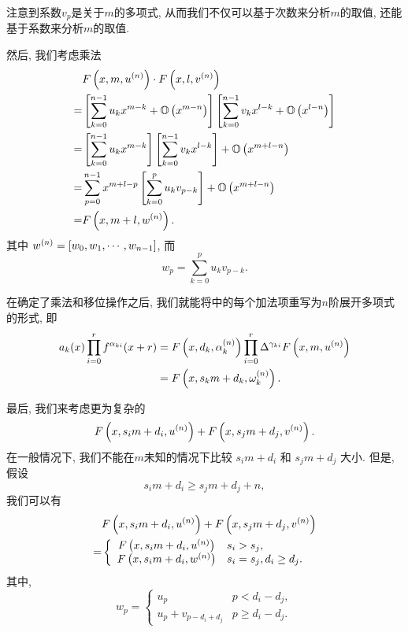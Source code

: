 注意到系数$v_p$是关于$m$的多项式, 从而我们不仅可以基于次数来分析$m$的取值, 还能基于系数来分析$m$的取值. 

然后, 我们考虑乘法 
\begin{equation}
\begin{split}
& F\left(x,m,u ^{(n)}\right)\cdot F\left(x,l,v^{(n)}\right) \\
=& \left[\sum_{k=0}^{n-1}{u_k x^{m-k}}+\mathbb O\left(x^{m-n}\right)\right]\left[\sum_{k=0}^{n-1}{v_k x^{l-k}}+\mathbb O\left(x^{l-n}\right)\right] \\
=& \left[\sum_{k=0}^{n-1}{u_k x^{m-k}}\right]\left[\sum_{k=0}^{n-1}{v_k x^{l-k}}\right]+\mathbb O\left(x^{m+l-n}\right) \\
=& \sum_{p=0}^{n-1}{x^{m+l-p}\left[\sum_{k=0}^p{u_k v_{p-k}}\right]}+\mathbb O\left(x^{m+l-n}\right) \\
=& F\left(x,m+l,w^{(n)}\right) .
\end{split}
\end{equation}
其中 $w^{(n)}=\left[w_0,w_1,\cdots,w_{n-1}\right]$, 而
\begin{equation}
w_p=\sum_{k=0}^p{u_k v_{p-k}}.
\end{equation}

在确定了乘法和移位操作之后, 我们就能将中的每个加法项重写为$n$阶展开多项式的形式, 即
\begin{equation}
\begin{split}
a_k(x)\prod_{i=0}^r{f^{\alpha_{ki}}(x+r)}&=F\left(x,d_k,\alpha_k^{(n)}\right)\prod_{i=0}^r{\Delta^{\gamma_{ki}}F\left(x,m,u^{(n)}\right)} \\
&= F\left(x,s_k m+d_k, \omega_k^{(n)}\right) .
\end{split}
\end{equation}

最后, 我们来考虑更为复杂的
\begin{equation}
F\left(x,s_i m+d_i,u^{(n)}\right)+F\left(x,s_j m+d_j,v^{(n)}\right).
\end{equation}
在一般情况下, 我们不能在$m$未知的情况下比较 $s_i m + d_i$ 和 $s_j m + d_j$ 大小. 但是, 假设
\begin{equation}
s_i m+d_i\ge s_j m+d_j+n, \label{cond_add}
\end{equation}
我们可以有 
\begin{equation}
\begin{split}
&F\left(x,s_i m+d_i,u^{(n)}\right)+F\left(x,s_j m+d_j,v^{(n)}\right) \\
=&\left\{
\begin{array}{cl}
    F\left(x,s_i m+d_i,u^{(n)}\right) & s_i>s_j ,            \\
    F\left(x,s_i m+d_i,w^{(n)}\right) & s_i=s_j,d_i\ge d_j .
\end{array}
\right.
\end{split}
\end{equation}
其中,
\begin{equation}
w_p=\left\{
\begin{array}{cl}
u_p               & p<d_i-d_j ,   \\
u_p+v_{p-d_i+d_j} & p\ge d_i-d_j.
\end{array}
\right.
\end{equation}

